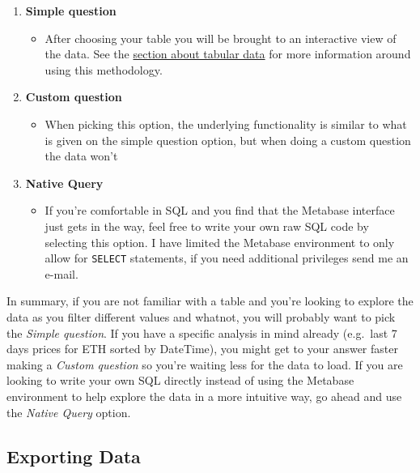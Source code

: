 \documentclass[
]{book}
\providecommand{\tightlist}{%
  \setlength{\itemsep}{0pt}\setlength{\parskip}{0pt}}
\begin{document}
\begin{enumerate}
\def\labelenumi{\arabic{enumi}.}
\item
  \textbf{Simple question}

  \begin{itemize}
  \tightlist
  \item
    After choosing your table you will be brought to an interactive view of the data. See the \protect\hyperlink{tabular-data}{section about tabular data} for more information around using this methodology.
  \end{itemize}
\item
  \textbf{Custom question}

  \begin{itemize}
  \tightlist
  \item
    When picking this option, the underlying functionality is similar to what is given on the simple question option, but when doing a custom question the data won't
  \end{itemize}
\item
  \textbf{Native Query}

  \begin{itemize}
  \tightlist
  \item
    If you're comfortable in SQL and you find that the Metabase interface just gets in the way, feel free to write your own raw SQL code by selecting this option. I have limited the Metabase environment to only allow for \texttt{SELECT} statements, if you need additional privileges send me an e-mail.
  \end{itemize}
\end{enumerate}

In summary, if you are not familiar with a table and you're looking to explore the data as you filter different values and whatnot, you will probably want to pick the \emph{Simple question}. If you have a specific analysis in mind already (e.g.~last 7 days prices for ETH sorted by DateTime), you might get to your answer faster making a \emph{Custom question} so you're waiting less for the data to load. If you are looking to write your own SQL directly instead of using the Metabase environment to help explore the data in a more intuitive way, go ahead and use the \emph{Native Query} option.

\hypertarget{exporting-data}{%
\subsection{Exporting Data}\label{exporting-data}}
\end{document}
